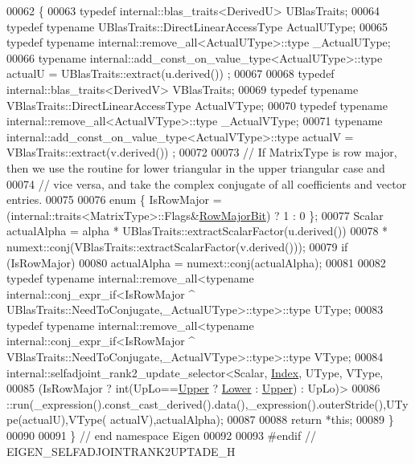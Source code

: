 \begin{DoxyCode}
00062 \{
00063   \textcolor{keyword}{typedef} internal::blas\_traits<DerivedU> UBlasTraits;
00064   \textcolor{keyword}{typedef} \textcolor{keyword}{typename} UBlasTraits::DirectLinearAccessType ActualUType;
00065   \textcolor{keyword}{typedef} \textcolor{keyword}{typename} internal::remove\_all<ActualUType>::type \_ActualUType;
00066   \textcolor{keyword}{typename} internal::add\_const\_on\_value\_type<ActualUType>::type actualU = UBlasTraits::extract(u.derived())
      ;
00067 
00068   \textcolor{keyword}{typedef} internal::blas\_traits<DerivedV> VBlasTraits;
00069   \textcolor{keyword}{typedef} \textcolor{keyword}{typename} VBlasTraits::DirectLinearAccessType ActualVType;
00070   \textcolor{keyword}{typedef} \textcolor{keyword}{typename} internal::remove\_all<ActualVType>::type \_ActualVType;
00071   \textcolor{keyword}{typename} internal::add\_const\_on\_value\_type<ActualVType>::type actualV = VBlasTraits::extract(v.derived())
      ;
00072 
00073   \textcolor{comment}{// If MatrixType is row major, then we use the routine for lower triangular in the upper triangular case
       and}
00074   \textcolor{comment}{// vice versa, and take the complex conjugate of all coefficients and vector entries.}
00075 
00076   \textcolor{keyword}{enum} \{ IsRowMajor = (internal::traits<MatrixType>::Flags&\hyperlink{group__flags_gae4f56c2a60bbe4bd2e44c5b19cbe8762}{RowMajorBit}) ? 1 : 0 \};
00077   Scalar actualAlpha = alpha * UBlasTraits::extractScalarFactor(u.derived())
00078                              * numext::conj(VBlasTraits::extractScalarFactor(v.derived()));
00079   \textcolor{keywordflow}{if} (IsRowMajor)
00080     actualAlpha = numext::conj(actualAlpha);
00081 
00082   \textcolor{keyword}{typedef} \textcolor{keyword}{typename} internal::remove\_all<typename internal::conj\_expr\_if<IsRowMajor ^
       UBlasTraits::NeedToConjugate,\_ActualUType>::type>::type UType;
00083   \textcolor{keyword}{typedef} \textcolor{keyword}{typename} internal::remove\_all<typename internal::conj\_expr\_if<IsRowMajor ^
       VBlasTraits::NeedToConjugate,\_ActualVType>::type>::type VType;
00084   internal::selfadjoint\_rank2\_update\_selector<Scalar, \hyperlink{namespace_eigen_a62e77e0933482dafde8fe197d9a2cfde}{Index}, UType, VType,
00085     (IsRowMajor ? int(UpLo==\hyperlink{group__enums_gga39e3366ff5554d731e7dc8bb642f83cda6bcb58be3b8b8ec84859ce0c5ac0aaec}{Upper} ? \hyperlink{group__enums_gga39e3366ff5554d731e7dc8bb642f83cda891792b8ed394f7607ab16dd716f60e6}{Lower} : \hyperlink{group__enums_gga39e3366ff5554d731e7dc8bb642f83cda6bcb58be3b8b8ec84859ce0c5ac0aaec}{Upper}) : UpLo)>
00086     ::run(\_expression().const\_cast\_derived().data(),\_expression().outerStride(),UType(actualU),VType(
      actualV),actualAlpha);
00087 
00088   \textcolor{keywordflow}{return} *\textcolor{keyword}{this};
00089 \}
00090 
00091 \} \textcolor{comment}{// end namespace Eigen}
00092 
00093 \textcolor{preprocessor}{#endif // EIGEN\_SELFADJOINTRANK2UPTADE\_H}
\end{DoxyCode}
